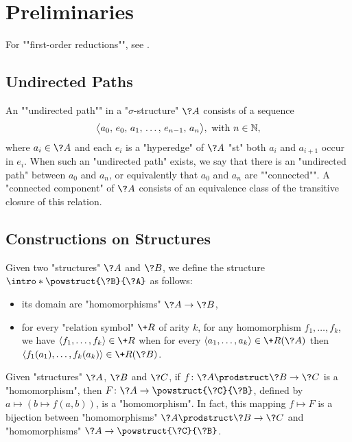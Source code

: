 \section{Preliminaries}

For \AP""first-order reductions"", see
\cite[Definition 2.11 \& Definition 1.26]{Immerman1998DescriptiveComplexity}.

\subsection{Undirected Paths}

An \AP""undirected path"" in a "$\sigma$-structure" $\?A$ consists of a sequence
\[\big\langle a_0,\, e_0,\, a_1,\, \hdots,\, e_{n-1},\, a_n\big\rangle, \text{ with } n \in \mathbb{N},\]
where $a_i \in \?A$ and each $e_i$ is a "hyperedge" of $\?A$ "st" both
$a_i$ and $a_{i+1}$ occur in $e_i$. When such an "undirected path" exists, we say that
there is an "undirected path" between $a_0$ and $a_n$, or equivalently
that $a_0$ and $a_n$ are \AP""connected"". A \AP"connected component" of $\?A$ consists of an equivalence class of the 
transitive closure of this relation.

\subsection{Constructions on Structures}

Given two "structures" $\?A$ and $\?B$, we define the structure \AP$\intro*\powstruct{\?B}{\?A}$ as follows:
\begin{itemize}
  \item its domain are "homomorphisms" $\?A \to \?B$,
  \item for every "relation symbol" $\+R$ of arity $k$, for any homomorphism $f_1,\hdots,f_k$,
  we have $\langle f_1,\hdots,f_k\rangle \in \+R$ when for every
  $\langle a_1,\hdots,a_k\rangle \in \+R(\?A)$
  then $\langle f_1(a_1), \hdots, f_k(a_k) \rangle \in \+R(\?B)$.
\end{itemize}


\begin{proposition}
	\AP\label{prop:currying-hom}
	Given "structures" $\?A$, $\?B$ and $\?C$, if $f\colon \?A\prodstruct \?B \to \?C$
	is a "homomorphism", then $F\colon \?A \to \powstruct{\?C}{\?B}$,
	defined by $a \mapsto (b \mapsto f(a,b))$, is a "homomorphism".
	In fact, this mapping $f \mapsto F$ is a bijection
	between "homomorphisms" $\?A\prodstruct \?B \to \?C$
	and "homomorphisms" $\?A \to \powstruct{\?C}{\?B}$.
  \end{proposition}
  
